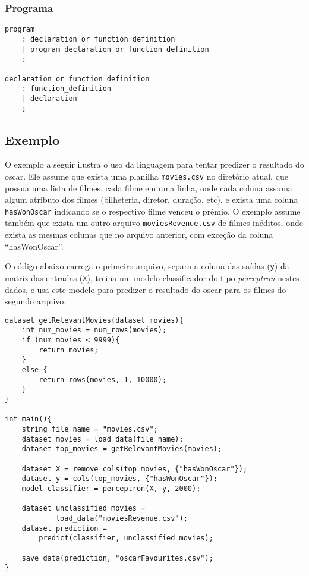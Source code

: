 \documentclass[12pt]{article}
\begin{document}
\subsubsection{Programa}
\begin{verbatim}
program
    : declaration_or_function_definition
    | program declaration_or_function_definition
    ;

declaration_or_function_definition
    : function_definition
    | declaration
    ;

\end{verbatim}


\subsection{Exemplo}

O exemplo a seguir ilustra o uso da linguagem para tentar predizer o resultado do oscar. Ele assume que exista uma planilha {\tt  movies.csv} no diretório atual, que possua uma lista de filmes, cada filme em uma linha, onde cada coluna assuma algum atributo dos filmes (bilheteria, diretor, duração, etc), e exista uma coluna {\tt hasWonOscar} indicando se o respectivo filme venceu o prêmio. O exemplo assume também que exista um outro arquivo {\tt moviesRevenue.csv} de filmes inéditos, onde exista as mesmas colunas que no arquivo anterior, com exceção da coluna ``hasWonOscar''.

O código abaixo carrega o primeiro arquivo, separa a coluna das saídas ({\tt y}) da matriz das entradas ({\tt X}), treina um modelo classificador do tipo {\it perceptron} nestes dados, e usa este modelo para predizer o resultado do oscar para os filmes do segundo arquivo.

\begin{Verbatim}
dataset getRelevantMovies(dataset movies){
	int num_movies = num_rows(movies);
	if (num_movies < 9999){
		return movies;
	}
	else {
		return rows(movies, 1, 10000);
	}
}

int main(){
	string file_name = "movies.csv";
	dataset movies = load_data(file_name);
	dataset top_movies = getRelevantMovies(movies);
	
	dataset X = remove_cols(top_movies, {"hasWonOscar"});
	dataset y = cols(top_movies, {"hasWonOscar"});
	model classifier = perceptron(X, y, 2000);
	
	dataset unclassified_movies = 
			load_data("moviesRevenue.csv");
	dataset prediction = 
		predict(classifier, unclassified_movies);
	
	save_data(prediction, "oscarFavourites.csv");
}
\end{Verbatim}
\end{document}
